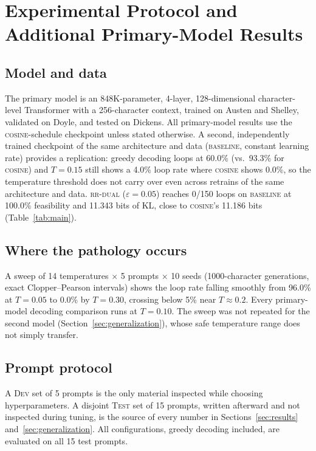 \section{Experimental Protocol and Additional Primary-Model Results}
\label{sec:protocol}

\subsection{Model and data}
The primary model is an 848K-parameter, 4-layer, 128-dimensional character-level Transformer with a 256-character context, trained on Austen and Shelley, validated on Doyle, and tested on Dickens. All primary-model results use the \textsc{cosine}-schedule checkpoint unless stated otherwise. A second, independently trained checkpoint of the same architecture and data (\textsc{baseline}, constant learning rate) provides a replication: greedy decoding loops at 60.0\% (vs.\ 93.3\% for \textsc{cosine}) and $T{=}0.15$ still shows a 4.0\% loop rate where \textsc{cosine} shows 0.0\%, so the temperature threshold does not carry over even across retrains of the same architecture and data. \textsc{rr-dual} ($\varepsilon{=}0.05$) reaches 0/150 loops on \textsc{baseline} at 100.0\% feasibility and 11.343 bits of KL, close to \textsc{cosine}'s 11.186 bits (Table~\ref{tab:main}).

\subsection{Where the pathology occurs}
A sweep of 14 temperatures $\times$ 5 prompts $\times$ 10 seeds (1000-character generations, exact Clopper--Pearson intervals) shows the loop rate falling smoothly from 96.0\% at $T{=}0.05$ to 0.0\% by $T{=}0.30$, crossing below 5\% near $T{\approx}0.2$. Every primary-model decoding comparison runs at $T{=}0.10$. The sweep was not repeated for the second model (Section~\ref{sec:generalization}), whose safe temperature range does not simply transfer.

\subsection{Prompt protocol}
A \textsc{Dev} set of 5 prompts is the only material inspected while choosing hyperparameters. A disjoint \textsc{Test} set of 15 prompts, written afterward and not inspected during tuning, is the source of every number in Sections~\ref{sec:results} and~\ref{sec:generalization}. All configurations, greedy decoding included, are evaluated on all 15 test prompts.


